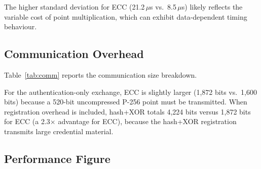 \documentclass[journal]{IEEEtran}
\begin{document}
The higher standard deviation for ECC (21.2\,$\mu$s vs.\ 8.5\,$\mu$s) likely
reflects the variable cost of point multiplication, which can exhibit
data-dependent timing behaviour.

\subsection{Communication Overhead}

Table~\ref{tab:comm} reports the communication size breakdown.

\begin{table}[!t]
\caption{Communication Overhead (bits per session)}
\label{tab:comm}
\centering
\small
{}
\end{table}

For the authentication-only exchange, ECC is slightly larger (1,872 bits
vs.\ 1,600 bits) because a 520-bit uncompressed P-256 point must be
transmitted. When registration overhead is included, hash+XOR totals 4,224
bits versus 1,872 bits for ECC (a 2.3$\times$ advantage for ECC), because
the hash+XOR registration transmits large credential material.

\subsection{Performance Figure}
\end{document}
